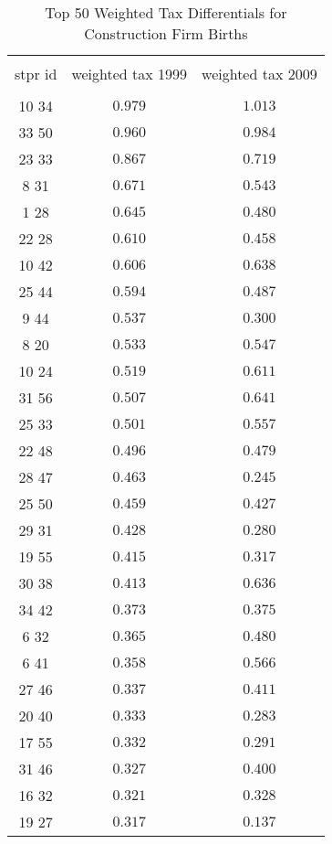 
\begin{table}[!htbp] \centering 
  \caption{Top 50 Weighted Tax Differentials for  Construction Firm Births} 
  \label{} 
\tiny 
\begin{tabular}{@{\extracolsep{5pt}} ccc} 
\\[-1.8ex]\hline 
\hline \\[-1.8ex] 
stpr id & weighted tax 1999 & weighted tax 2009 \\ 
\hline \\[-1.8ex] 
10 34  & $0.979$ & $1.013$ \\ 
33 50  & $0.960$ & $0.984$ \\ 
23 33  & $0.867$ & $0.719$ \\ 
8 31  & $0.671$ & $0.543$ \\ 
1 28  & $0.645$ & $0.480$ \\ 
22 28  & $0.610$ & $0.458$ \\ 
10 42  & $0.606$ & $0.638$ \\ 
25 44  & $0.594$ & $0.487$ \\ 
9 44  & $0.537$ & $0.300$ \\ 
8 20  & $0.533$ & $0.547$ \\ 
10 24  & $0.519$ & $0.611$ \\ 
31 56  & $0.507$ & $0.641$ \\ 
25 33  & $0.501$ & $0.557$ \\ 
22 48  & $0.496$ & $0.479$ \\ 
28 47  & $0.463$ & $0.245$ \\ 
25 50  & $0.459$ & $0.427$ \\ 
29 31  & $0.428$ & $0.280$ \\ 
19 55  & $0.415$ & $0.317$ \\ 
30 38  & $0.413$ & $0.636$ \\ 
34 42  & $0.373$ & $0.375$ \\ 
6 32  & $0.365$ & $0.480$ \\ 
6 41  & $0.358$ & $0.566$ \\ 
27 46  & $0.337$ & $0.411$ \\ 
20 40  & $0.333$ & $0.283$ \\ 
17 55  & $0.332$ & $0.291$ \\ 
31 46  & $0.327$ & $0.400$ \\ 
16 32  & $0.321$ & $0.328$ \\ 
19 27  & $0.317$ & $0.137$ \\ 

\end{tabular}
\end{table}
